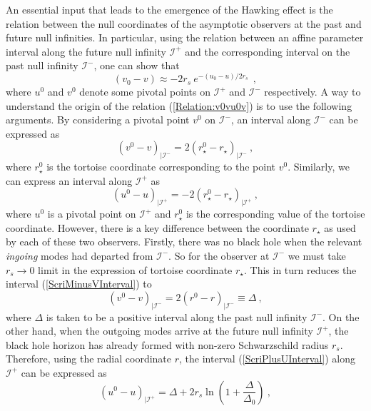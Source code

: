 \documentclass[aps,12pt,showpacs]{revtex4-2}
\def\rs{r_s}
\def\rstar{r_{\star}}
\def\scriplus{\mathscr{I}^{+}}
\def\scriminus{\mathscr{I}^{-}}
\begin{document}
An essential input that leads to the emergence of the Hawking effect is the 
relation between the null coordinates of the asymptotic observers at the past 
and future null infinities. In particular, using the relation between an affine 
parameter interval along the future null infinity $\scriplus$ and the 
corresponding interval on the past null infinity $\scriminus$, one can show that
%
\begin{equation}\label{Relation:v0vu0v}
(v_0 - v) \approx -2\rs~ e^{-(u_0 - u)/2 \rs} ~~,
\end{equation}
%
where $u^0$ and $v^0$ denote some pivotal points on $\scriplus$ and 
$\scriminus$ respectively. A way to understand the origin of the relation 
(\ref{Relation:v0vu0v}) is to use the following arguments. By 
considering a pivotal point $v^0$ on $\scriminus$, an interval along 
$\scriminus$ can be expressed as
%
\begin{equation}\label{ScriMinusVInterval}
(v^0 - v)_{|\scriminus} = 2(\rstar^0 -\rstar)_{|\scriminus}  ~,
\end{equation}
%
where $\rstar^0$ is the tortoise coordinate corresponding to the point $v^0$. 
Similarly, we can express an interval along $\scriplus$ as 
%
\begin{equation}\label{ScriPlusUInterval}
(u^0 - u)_{|\scriplus} = - 2(\rstar^0 -\rstar)_{|\scriplus} ~,
\end{equation}
%
where $u^0$ is a pivotal point on $\scriplus$ and $\rstar^0$ is the 
corresponding value of the tortoise coordinate. However, there is a key 
difference between the coordinate $\rstar$ as used by each of these two 
observers. Firstly, there was no black hole when the relevant \emph{ingoing} 
modes had departed from $\scriminus$. So for the observer at $\scriminus$ we 
must take $\rs\to0$ limit in the expression of tortoise coordinate $\rstar$. 
This in turn reduces the interval (\ref{ScriMinusVInterval}) to
%
\begin{equation}\label{ScriMinusVInterval2}
(v^0 - v)_{|\scriminus} = 2(r^0 -r)_{|\scriminus} \equiv \Delta ~,
\end{equation}
%
where $\Delta$ is taken to be a positive interval along the past null infinity 
$\scriminus$. On the other hand, when the outgoing modes arrive at the future 
null infinity $\scriplus$, the black hole horizon has already formed with
non-zero Schwarzschild radius $\rs$. Therefore, using the 
radial coordinate $r$, the interval (\ref{ScriPlusUInterval}) along $\scriplus$ 
can be expressed  as
%
\begin{equation}\label{ScriMinusUInterval}
(u^0 - u)_{|\scriplus} = \Delta + 
2\rs \ln \left(1 + \frac{\Delta}{\Delta_0}\right) ~,
\end{equation}
\end{document}

